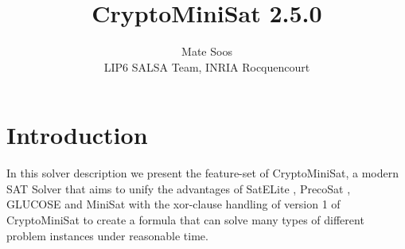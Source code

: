 \documentclass[final]{ieee}
\begin{document}

\title{CryptoMiniSat 2.5.0}
\author{Mate Soos\\LIP6 SALSA Team, INRIA Rocquencourt}

\maketitle
\thispagestyle{empty}
\pagestyle{empty}


\section{Introduction}

In this solver description we present the feature-set of CryptoMiniSat, a modern SAT Solver that aims to unify the advantages of SatELite \cite{DBLP:conf/sat/EenB05}, PrecoSat \cite{precosat}, GLUCOSE \cite{glucose} and MiniSat \cite{EenS03MiniSat} with the xor-clause handling of version 1 of CryptoMiniSat \cite{DBLP:conf/sat/SoosNC09} to create a formula that can solve many types of different problem instances under reasonable time.

\end{document}
